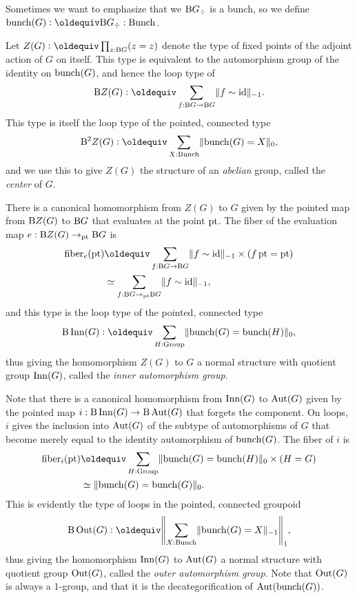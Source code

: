 Sometimes we want to emphasize that we $\mathrm B G_\div$ is a bunch,
so we define $\bunch(G) \defeq \B G_\div : \Bunch$.

\begin{definition}
  Let $Z(G) \defeq \prod_{z : \B G}(z = z)$ denote the type of fixed points of the adjoint action of $G$ on itself.
  This type is equivalent to the automorphism group of the identity on $\operatorname{bunch}(G)$,
  and hence the loop type of
  \[
    \B Z(G) \defeq \sum_{f : \B G \to \B G} \merely{f \sim \id}.
  \]
  This type is itself the loop type of the pointed, connected type
  \[
    \B^2Z(G) \defeq \sum_{X : \Bunch}\Trunc{\bunch(G) = X}_0,
  \]
  and we use this to give $Z(G)$ the structure of an \emph{abelian} group,
  called the \emph{center} of $G$.
\end{definition}
There is a canonical homomorphism from $Z(G)$ to $G$ given by the pointed map
from $\mathrm B Z(G)$ to $\mathrm B G$ that evaluates at the point ${\mathord{\mathrm{pt}}}$.
The fiber of the evaluation map $e : \mathrm B Z(G) \to_{\mathord{\mathrm{pt}}} \mathrm B G$ is
\begin{align*}
  \fiber_e(\pt)
  &\jdeq \sum_{f : \B G \to \B G} \merely{f \sim \id} \times (\mathop f \pt = \pt) \\
  &\equiv \sum_{f : \B G \to_\pt \B G} \merely{f \sim \id},
\end{align*}
and this type is the loop type of the pointed, connected type
\[
  \B\Inn(G) \defeq \sum_{H : \Group} \Trunc{\bunch(G) = \bunch(H)}_0,
\]
thus giving the homomorphism $Z(G)$ to $G$ a normal structure with
quotient group $\operatorname{Inn}(G)$, called the \emph{inner automorphism group}.

Note that there is a canonical homomorphism from $\operatorname{Inn}(G)$ to $\operatorname{Aut}(G)$
given by the pointed map $i : \mathrm B\operatorname{Inn}(G) \to \mathrm B\operatorname{Aut}(G)$ that forgets the component.
On loops, $i$ gives the inclusion into $\operatorname{Aut}(G)$ of the subtype of automorphisms of $G$
that become merely equal to the identity automorphism of $\operatorname{bunch}(G)$.
The fiber of $i$ is
\begin{align*}
  \fiber_i(\pt)
  &\jdeq \sum_{H : \Group} \Trunc{\bunch(G) = \bunch(H)}_0 \times (H = G) \\
  &\equiv \Trunc{\bunch(G) = \bunch(G)}_0.
\end{align*}
This is evidently the type of loops in the pointed, connected groupoid
\[
  \B\Out(G) \defeq \Trunc*{\sum_{X : \Bunch}\merely{\bunch(G) = X}}_1,
\]
thus giving the homomorphism $\operatorname{Inn}(G)$ to $\operatorname{Aut}(G)$ a normal structure with
quotient group $\operatorname{Out}(G)$, called the \emph{outer automorphism group}.
Note that $\operatorname{Out}(G)$ is always a $1$-group,
and that it is the decategorification of $\operatorname{Aut}(\operatorname{bunch}(G))$.

